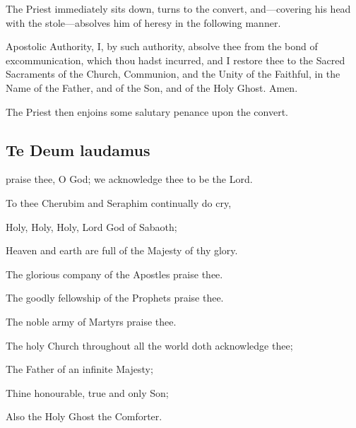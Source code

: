 \vspace{-0.25\baselineskip}

\begin{rubric}
    The Priest immediately sits down, turns to the convert, and---covering his head with the stole---absolves him of heresy in the following manner.
\end{rubric}
 Apostolic Authority, I, by such authority, absolve thee from the bond of excommunication, which thou hadst incurred, and I restore thee to the Sacred Sacraments of the Church, Communion, and the Unity of the Faithful, in the Name of the Father, and of the Son, {} and of the Holy Ghost. Amen.

\begin{rubric}
    The Priest then enjoins some salutary penance upon the convert.
\end{rubric}

\subsection{Te Deum laudamus}
 praise thee, O God; we acknowledge thee to be the Lord.\par
{}
    To thee Cherubim and Seraphim continually do cry,\par
    Holy, Holy, Holy, Lord God of Sabaoth;\par
    Heaven and earth are full of the Majesty of thy glory.\par
    The glorious company of the Apostles praise thee.\par
    The goodly fellowship of the Prophets praise thee.\par
    The noble army of Martyrs praise thee.\par
    The holy Church throughout all the world doth acknowledge thee;\par
    The Father of an infinite Majesty;\par
    Thine honourable, true and only Son;\par
    Also the Holy Ghost the Comforter.\par
    
